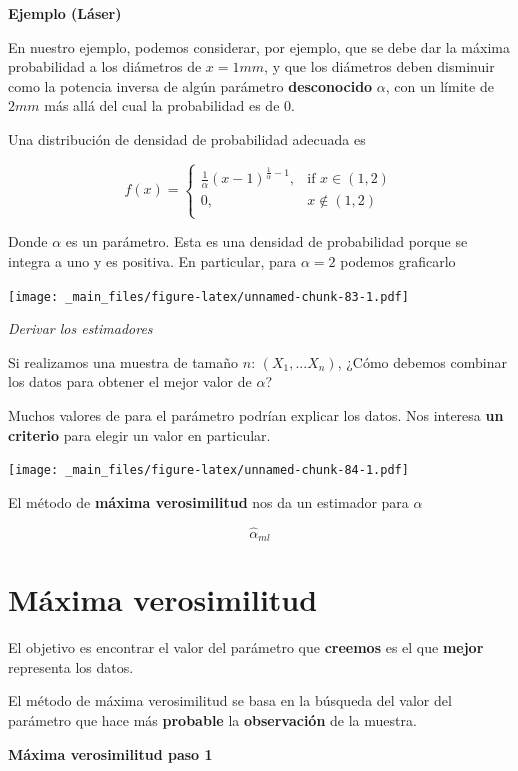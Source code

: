 \documentclass[
]{book}
\begin{document}
\textbf{Ejemplo (Láser)}

En nuestro ejemplo, podemos considerar, por ejemplo, que se debe dar la máxima probabilidad a los diámetros de \(x=1 mm\), y que los diámetros deben disminuir como la potencia inversa de algún parámetro \textbf{desconocido} \(\alpha\), con un límite de \(2mm\) más allá del cual la probabilidad es de \(0\).

Una distribución de densidad de probabilidad adecuada es

\[
    f(x)= 
\begin{cases}
\frac{1}{\alpha}(x-1)^{\frac{1}{\alpha}-1},& \text{if } x \in (1,2)\\
    0,& x \notin (1,2)\\
\end{cases}
\]

Donde \(\alpha\) es un parámetro. Esta es una densidad de probabilidad porque se integra a uno y es positiva. En particular, para \(\alpha=2\) podemos graficarlo

\texttt{[image: \_main\_files/figure-latex/unnamed-chunk-83-1.pdf]}

\emph{Derivar los estimadores}

Si realizamos una muestra de tamaño \(n\): \((X_1,...X_n)\), ¿Cómo debemos combinar los datos para obtener el mejor valor de \(\alpha\)?

Muchos valores de para el parámetro podrían explicar los datos. Nos interesa \textbf{un criterio} para elegir un valor en particular.

\texttt{[image: \_main\_files/figure-latex/unnamed-chunk-84-1.pdf]}

El método de \textbf{máxima verosimilitud} nos da un estimador para \(\alpha\)

\[\hat{\alpha}_{ml}\]

\hypertarget{muxe1xima-verosimilitud-1}{%
\section{Máxima verosimilitud}\label{muxe1xima-verosimilitud-1}}

El objetivo es encontrar el valor del parámetro que \textbf{creemos} es el que \textbf{mejor} representa los datos.

El método de máxima verosimilitud se basa en la búsqueda del valor del parámetro que hace más \textbf{probable} la \textbf{observación} de la muestra.

\textbf{Máxima verosimilitud paso 1}
\end{document}
